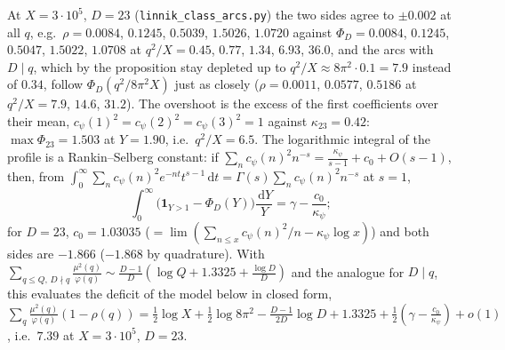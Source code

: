 \documentclass[11pt]{amsart}
\theoremstyle{remark}
\newcommand{\dd}{\,\mathrm d}
\begin{document}
At $X=3\cdot10^5$, $D=23$ (\texttt{linnik\_class\_arcs.py}) the two sides agree to $\pm0.002$ at all $q$, e.g.\ $\rho=0.0084$, $0.1245$, $0.5039$, $1.5026$, $1.0720$ against $\Phi_D=0.0084$, $0.1245$, $0.5047$, $1.5022$, $1.0708$ at $q^2/X=0.45$, $0.77$, $1.34$, $6.93$, $36.0$, and the arcs with $D\mid q$, which by the proposition stay depleted up to $q^2/X\approx8\pi^2\cdot0.1=7.9$ instead of $0.34$, follow $\Phi_D(q^2/8\pi^2X)$ just as closely ($\rho=0.0011$, $0.0577$, $0.5186$ at $q^2/X=7.9$, $14.6$, $31.2$). The overshoot is the excess of the first coefficients over their mean, $c_\psi(1)^2=c_\psi(2)^2=c_\psi(3)^2=1$ against $\kappa_{23}=0.42$: $\max\Phi_{23}=1.503$ at $Y=1.90$, i.e.\ $q^2/X=6.5$. The logarithmic integral of the profile is a Rankin--Selberg constant: if $\sum_nc_\psi(n)^2n^{-s}=\frac{\kappa_\psi}{s-1}+c_0+O(s-1)$, then, from $\int_0^\infty\sum_nc_\psi(n)^2e^{-nt}t^{s-1}\dd t=\Gamma(s)\sum_nc_\psi(n)^2n^{-s}$ at $s=1$,
\[
\int_0^\infty\bigl(\mathbf 1_{Y>1}-\Phi_D(Y)\bigr)\frac{\dd Y}Y=\gamma-\frac{c_0}{\kappa_\psi};
\]
for $D=23$, $c_0=1.03035$ ($=\lim(\sum_{n\le x}c_\psi(n)^2/n-\kappa_\psi\log x)$) and both sides are $-1.866$ ($-1.868$ by quadrature). With $\sum_{q\le Q,\,D\nmid q}\frac{\mu^2(q)}{\varphi(q)}\sim\frac{D-1}D(\log Q+1.3325+\frac{\log D}D)$ and the analogue for $D\mid q$, this evaluates the deficit of the model below in closed form, $\sum_q\frac{\mu^2(q)}{\varphi(q)}(1-\rho(q))=\frac12\log X+\frac12\log8\pi^2-\frac{D-1}{2D}\log D+1.3325+\frac12(\gamma-\frac{c_0}{\kappa_\psi})+o(1)$, i.e.\ $7.39$ at $X=3\cdot10^5$, $D=23$.
\end{document}
